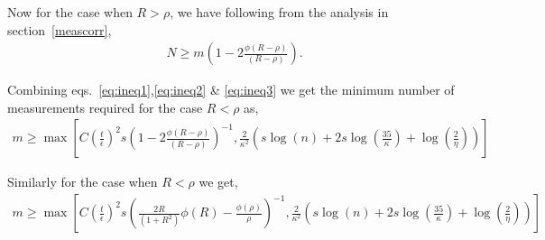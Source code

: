 Now for the case when $R> \rho$, we have following from the analysis in section~\ref{meascorr},
\begin{align}
N \geq m \left(1-2\frac{\phi(R-\rho)}{(R-\rho)} \right).
\label{eq:ineq3}
\end{align}

Combining eqs.~\ref{eq:ineq1},\ref{eq:ineq2} \& \ref{eq:ineq3} we get the minimum number of measurements required for the case $R < \rho$ as,
\begin{align}
m \geq \max\left[C\left(\frac{t}{\epsilon}\right)^2s \left(1-2\frac{\phi(R-\rho)}{(R-\rho)} \right)^{-1}, \frac{2}{\kappa^2}\left(s\log{(n)} + 2s\log{\left(\frac{35}{\kappa}\right)}+\log{\left(\frac{2}{\eta}\right)}\right) \right]
\label{eq:ineq4}
\end{align}
 
Similarly for the case when $R<\rho$ we get,
\begin{align}
m \geq \max\left[C\left(\frac{t}{\epsilon}\right)^2s \left(\frac{2R}{(1+R^2)} \phi(R) - \frac{\phi(\rho)}{\rho}\right)^{-1}, \frac{2}{\kappa^2}\left(s\log{(n)} + 2s\log{\left(\frac{35}{\kappa}\right)}+\log{\left(\frac{2}{\eta}\right)}\right) \right]
\label{eq:ineq5}
\end{align}